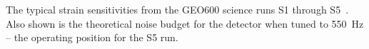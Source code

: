 The typical strain sensitivities from the GEO600 science runs S1
through S5~\cite{GEOcurves}. Also shown is the theoretical noise budget for the
detector when tuned to 550~Hz -- the operating position for the S5 run.